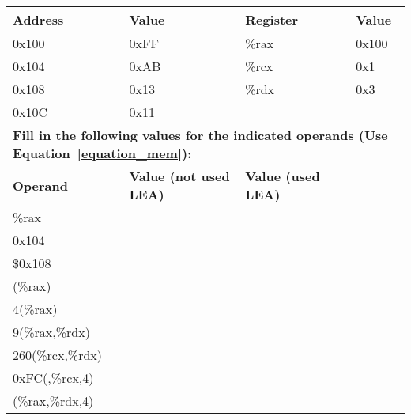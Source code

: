 \documentclass{article}
\begin{document}
\begin{table}[h!]
    \centering
    \small
    \renewcommand{\arraystretch}{1.2}
    \begin{tabular}{ll ll}
        \toprule
        \textbf{Address} & \textbf{Value} & \textbf{Register} & \textbf{Value} \\
        \midrule
        0x100 & 0xFF  & \%rax & 0x100 \\
        0x104 & 0xAB  & \%rcx & 0x1 \\
        0x108 & 0x13  & \%rdx & 0x3 \\
        0x10C & 0x11  & & \\
        \midrule
        \multicolumn{4}{l}{\textbf{Fill in the following values for the indicated operands (Use Equation~\ref{equation_mem}):}} \\
        \midrule
        \textbf{Operand} & \textbf{Value (not used LEA)} & \textbf{Value (used LEA)} \\
        \midrule
        \%rax & \underline{\hspace{3cm}} & \underline{\hspace{3cm}} \\
        0x104 & \underline{\hspace{3cm}} & \underline{\hspace{3cm}} \\
        \$0x108 & \underline{\hspace{3cm}} & \underline{\hspace{3cm}} \\
        (\%rax) & \underline{\hspace{3cm}} & \underline{\hspace{3cm}} \\
        4(\%rax) & \underline{\hspace{3cm}} & \underline{\hspace{3cm}} \\
        9(\%rax,\%rdx) & \underline{\hspace{3cm}} & \underline{\hspace{3cm}} \\
        260(\%rcx,\%rdx) & \underline{\hspace{3cm}} & \underline{\hspace{3cm}} \\
        0xFC(,\%rcx,4) & \underline{\hspace{3cm}} & \underline{\hspace{3cm}} \\
        (\%rax,\%rdx,4) & \underline{\hspace{3cm}} & \underline{\hspace{3cm}} \\
        \bottomrule
    \end{tabular}
\end{table}
\end{document}
